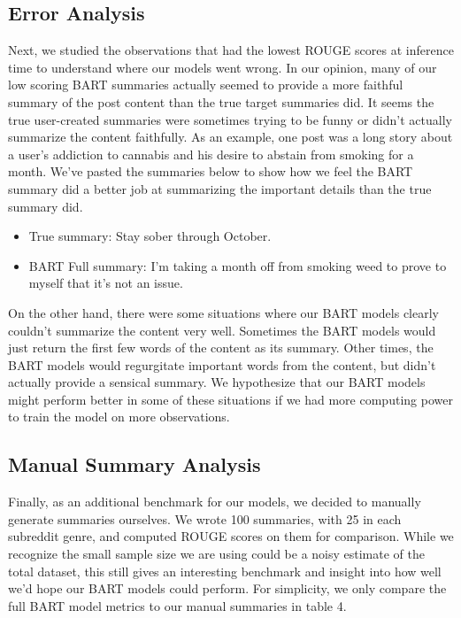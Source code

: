 \documentclass[11pt,a4paper, twocolumn]{article}
\begin{document}
\subsection{Error Analysis}

Next, we studied the observations that had the lowest ROUGE scores at inference time to understand where our models went wrong. 
In our opinion, many of our low scoring BART summaries actually seemed to provide a more faithful summary of the post content than the true target summaries did. 
It seems the true user-created summaries were sometimes trying to be funny or didn't actually summarize the content faithfully. 
As an example, one post was a long story about a user's addiction to cannabis and his desire to abstain from smoking for a month. 
We've pasted the summaries below to show how we feel the BART summary did a better job at summarizing the important details than the true summary did. 

\begin{itemize}
  \item True summary: Stay sober through October.
  \item BART Full summary: I'm taking a month off from smoking weed to prove to myself that it's not an issue.
\end{itemize}

On the other hand, there were some situations where our BART models clearly couldn't summarize the content very well. 
Sometimes the BART models would just return the first few words of the content as its summary. 
Other times, the BART models would regurgitate important words from the content, but didn't actually provide a sensical summary. 
We hypothesize that our BART models might perform better in some of these situations if we had more computing power to train the model on more observations. 

\subsection{Manual Summary Analysis}

Finally, as an additional benchmark for our models, we decided to manually generate summaries ourselves. 
We wrote 100 summaries, with 25 in each subreddit genre, and computed ROUGE scores on them for comparison. 
While we recognize the small sample size we are using could be a noisy estimate of the total dataset, 
this still gives an interesting benchmark and insight into how well we'd hope our BART models could perform.
For simplicity, we only compare the full BART model metrics to our manual summaries in table 4. 
\end{document}
